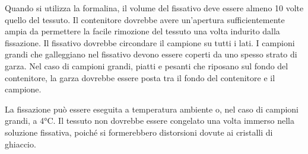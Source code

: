 Quando si utilizza la formalina, il volume del fissativo deve essere almeno 10 volte quello del tessuto. Il contenitore dovrebbe avere un'apertura sufficientemente ampia da permettere la facile rimozione del tessuto una volta indurito dalla fissazione. Il fissativo dovrebbe circondare il campione su tutti i lati. I campioni grandi che galleggiano nel fissativo devono essere coperti da uno spesso strato di garza. Nel caso di campioni grandi, piatti e pesanti che riposano sul fondo del contenitore, la garza dovrebbe essere posta tra il fondo del contenitore e il campione.

La fissazione può essere eseguita a temperatura ambiente o, nel caso di campioni grandi, a 4°C. Il tessuto non dovrebbe essere congelato una volta immerso nella soluzione fissativa, poiché si formerebbero distorsioni dovute ai cristalli di ghiaccio.
